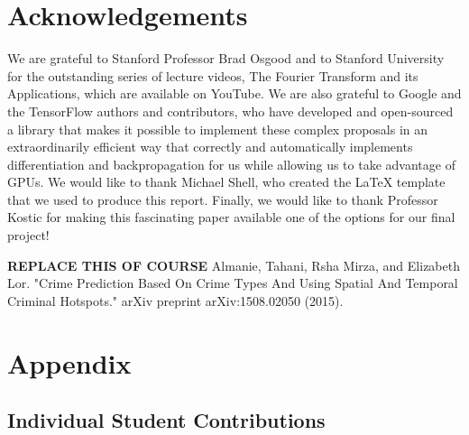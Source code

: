 \documentclass[10pt,journal,compsoc]{IEEEtran}
\begin{document}
\section{Acknowledgements}

We are grateful to Stanford Professor Brad Osgood and to Stanford University for the outstanding series of lecture videos, The Fourier Transform and its Applications, which are available on YouTube. We are also grateful to Google and the TensorFlow authors and contributors, who have developed and open-sourced a library that makes it possible to implement these complex proposals in an extraordinarily efficient way that correctly and automatically implements differentiation and backpropagation for us while allowing us to take advantage of GPUs. We would like to thank Michael Shell, who created the LaTeX template that we used to produce this report. Finally, we would like to thank Professor Kostic for making this fascinating paper available one of the options for our final project!


\begin{thebibliography}{1}

\textbf{REPLACE THIS OF COURSE} Almanie, Tahani, Rsha Mirza, and Elizabeth Lor. "Crime Prediction Based On Crime Types And Using Spatial And Temporal Criminal Hotspots." arXiv preprint arXiv:1508.02050 (2015).\\

\end{thebibliography}

\section{Appendix}

\subsection{Individual Student Contributions}
\end{document}

